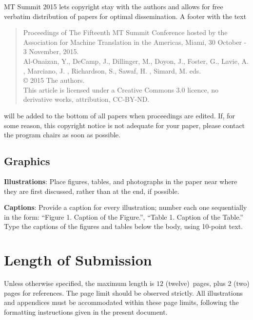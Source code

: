 \documentclass[]{article}
\newcommand{\confname}{MT Summit 2015}
\newcommand{\paperlength}{$12$ (twelve)}
\newcommand{\shortpaperlength}{$6$ (six)}
\begin{document}
\confname{} lets copyright stay with the authors and allows for free verbatim distribution of papers for optimal dissemination. A footer with the text
\begin{quote}
\begin{small}
\begin{it}
  Proceedings of The Fifteenth MT Summit Conference hosted by the Association for Machine Translation in the Americas, Miami, 30 October - 3 November, 2015.\\
  Al-Onaizan, Y., DeCamp, J., Dillinger, M., Doyon, J., Foster, G., Lavie, A. , Marciano, J. , Richardson, S., Sawaf, H. , Simard,
  M. eds.\\
  \copyright{} 2015 The authors.\\
  This article is licensed under a Creative Commons 3.0 licence, no
  derivative works, attribution, CC-BY-ND.
\end{it}
\end{small}
\end{quote}
will be added to the bottom of all papers when proceedings are
edited. If, for some reason, this copyright notice is not adequate for
your paper, please contact the program chairs as soon as possible. 

\subsection{Graphics}

{\bf Illustrations}: Place figures, tables, and photo\-graphs in the
paper near where they are first discussed, rather than at the end, if
possible.

{\bf Captions}: Provide a caption for every illustration; number
each one sequentially in the form:  ``Figure 1. Caption of the
Figure.'', ``Table 1. Caption of the Table.''  Type the captions of
the figures and tables below the body, using 10-point text.

\section{Length of Submission}
\label{sec:length}

Unless otherwise specified, the maximum length is \paperlength~pages,
plus 2 (two) pages for references. 
The page limit should be observed strictly. All illustrations and
appendices must be accommodated within these page limits, following
the formatting instructions given in the present document.

\small



\end{document}

